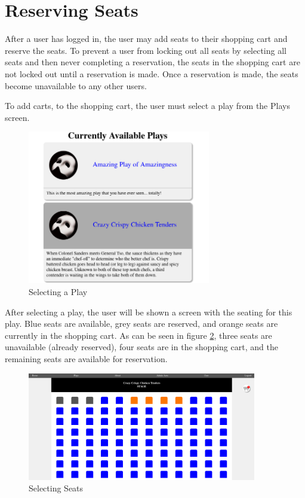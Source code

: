 \section{Reserving Seats}\label{sec:reserving_seats}

After a user has logged in, the user may add seats to their shopping cart and reserve the seats. To prevent a user from locking out all seats by selecting all seats and then never completing a reservation, the seats in the shopping cart are not locked out until a reservation is made. Once a reservation is made, the seats become unavailable to any other users.

To add carts, to the shopping cart, the user must select a play from the Plays screen.

\begin{figure}[ht]
    \centering
    \includegraphics[width=8cm]{images/chapter3/play selection}
    \caption{Selecting a Play}
    \label{fig:play_selection}
\end{figure}

After selecting a play, the user will be shown a screen with the seating for this play. Blue seats are available, grey seats are reserved, and orange seats are currently in the shopping cart. As can be seen in figure \ref{fig:play_seating_selection}, three seats are unavailable (already reserved), four seats are in the shopping cart, and the remaining seats are available for reservation.

\begin{figure}[ht]
    \centering
    \includegraphics[width=10cm]{images/chapter3/play seating selection}
    \caption{Selecting Seats}
    \label{fig:play_seating_selection}
\end{figure}

